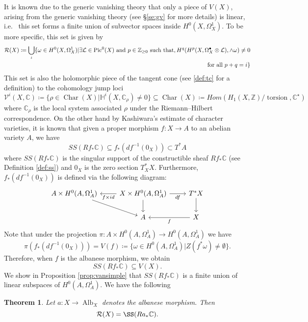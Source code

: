 \documentclass[12pt,reqno]{amsart}
\newtheorem{alphtheorem}{Theorem}
\theoremstyle{question}
\theoremstyle{definition}
\theoremstyle{remark}
\theoremstyle{cited}
\theoremstyle{citeddef}
\DeclareMathOperator{\Alb}{Alb}
\DeclareMathOperator{\Char}{Char}
\def\Pic{{\rm Pic}}
\newcommand{\sL}{\mathcal{L}}
\newcommand{\sR}{\mathcal{R}}
\newcommand\sV{{\mathcal V}}
\newcommand{\bbC}{\mathbb{C}}
\newcommand{\bbH}{\mathbb{H}}
\newcommand{\bbZ}{\mathbb{Z}}
\DeclareMathOperator{\torsion}{torsion}
\begin{document}
It is known due to the generic vanishing theory
that only a piece of $V(X)$, arising from the generic vanishing theory (see \S \ref{se:gv} for more details) is linear, i.e.\
this set forms a finite union of subvector spaces inside $H^0(X, \Omega_X^1)$. To be more specific, this set is given by
\cite[p.\ 311]{Ara92}
\begin{equation}
\begin{split}
\sR(X)\coloneqq \bigcup_i\{\omega\in H^0(X, \Omega_X^1)| \exists \sL\in \Pic^0(X) \text{ and } p\in \bbZ_{\geq 0} \text{ such that},
H^q(H^{p}(X, \Omega_X^{\bullet}\otimes \sL), \wedge\omega) \neq 0
\\\text{ for all } p+q=i\}
\label{eq:}
\end{split}
\end{equation}
This set is also the holomorphic piece of the tangent cone 
(see \ref{def:tc} for a definition) to the cohomology jump loci 
\[\sV^i(X,\bbC) \coloneqq \{\rho\in\Char(X)| \bbH^i(X, \bbC_{\rho})\neq  0\}\subseteq \Char(X) \coloneqq Hom(H_1(X,\bbZ)/\torsion, \bbC^{\star})\]
where $\bbC_{\rho}$ is the local system associated $\rho$
under the Riemann--Hilbert correspondence.
On the other hand by Kashiwara's estimate
of character varieties, it is known that given a proper morphism
$f\colon X\to A$ to an abelian variety $A$, we have
\[SS(Rf_*\bbC) \subseteq f_*(df^{-1}(0_X))\subset T^*A\]
where $SS(Rf_*\bbC)$ is the singular support of the constructible
sheaf $Rf_*\bbC$ (see Definition \ref{def:ss}) and $0_X$ is the
zero section $T^*_XX$. Furthermore, $f_*(df^{-1}(0_X))$ is
defined via the following diagram:
\begin{equation}
\begin{tikzcd}
A\times H^0(A,\Omega_A^1)  \ar[dr]
& X\times H^0(A, \Omega_A^1)\ar[r, "df"']\ar[d] \ar[l, "f\times id"]
& T^*X \ar[d]\\
&A  & X\ar[l, "f"]
\end{tikzcd}
\label{eq:maindiagram}
\end{equation}
Note that under the projection $\pi\colon A\times H^0(A,\Omega_A^1)\to H^0(A,\Omega_A^1)$ we have
\[\pi(f_*(df^{-1}(0_X))) = V(f) \coloneqq \{\omega\in H^0(A,\Omega_A^1)|
Z(f^*\omega) \neq \emptyset\}.\]
Therefore, when $f$ is the albanese morphism, we obtain
\[SS(Rf_*\bbC)\subseteq V(X).\]
We show in Proposition \ref{prop:vansimple} 
that $SS(Rf_*\bbC)$ is a finite union of linear subspaces of $H^0(A,\Omega_A^1)$. We
have the following
\begin{alphtheorem}
Let $a\colon X\to \Alb_X$ denotes the albanese morphism. Then
\[\sR(X) =  \SS(Ra_*\bbC). \]
\label{thm:linearity}
\end{alphtheorem}
\end{document}
